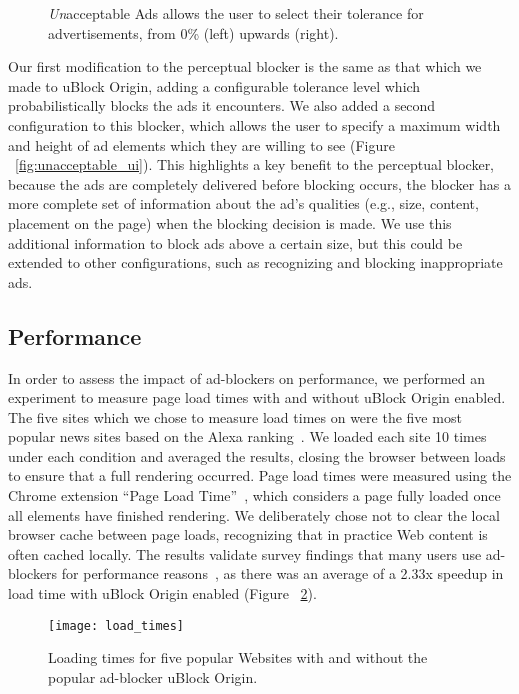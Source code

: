 \begin{figure}[t]
\hfill
{}
\hfill
{}
\hfill
\caption{\textit{Un}acceptable Ads allows the user to select their tolerance for advertisements, from 0\% (left) upwards (right).}
\label{fig:unacceptable}
\end{figure}

Our first modification to the perceptual blocker is the same as that which we made to uBlock Origin, adding a configurable tolerance level which probabilistically blocks the ads it encounters.
We also added a second configuration to this blocker, which allows the user to specify a maximum width and height of ad elements which they are willing to see (Figure ~\ref{fig:unacceptable_ui}).
This highlights a key benefit to the perceptual blocker, because the ads are completely delivered before blocking occurs, the blocker has a more complete set of information about the ad's qualities (e.g., size, content, placement on the page) when the blocking decision is made.
We use this additional information to block ads above a certain size, but this could be extended to other configurations, such as recognizing and blocking inappropriate ads.

\subsection{Performance}
In order to assess the impact of ad-blockers on performance, we performed an experiment to measure page load times with and without uBlock Origin enabled.
The five sites which we chose to measure load times on were the five most popular news sites based on the Alexa ranking~\cite{alexa}.
We loaded each site 10 times under each condition and averaged the results, closing the browser between loads to ensure that a full rendering occurred.
Page load times were measured using the Chrome extension ``Page Load Time''~\cite{pageloadtime}, which considers a page fully loaded once all elements have finished rendering.
We deliberately chose not to clear the local browser cache between page loads, recognizing that in practice Web content is often cached locally.
The results validate survey findings that many users use ad-blockers for performance reasons~\cite{hubspot2016adblock}, as there was an average of a 2.33x speedup in load time with uBlock Origin enabled (Figure ~\ref{fig:load_times}).

\begin{figure}[t]
\centering
\texttt{[image: load\_times]}
\caption{Loading times for five popular Websites with and without the popular ad-blocker uBlock Origin.}
\label{fig:load_times}
\end{figure}

